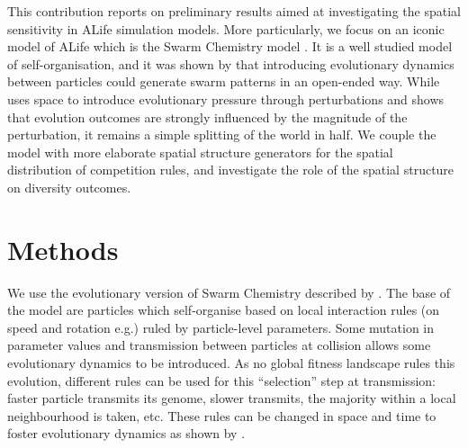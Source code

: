 \documentclass[letterpaper]{article}
\begin{document}
This contribution reports on preliminary results aimed at investigating the spatial sensitivity in ALife simulation models. More particularly, we focus on an iconic model of ALife which is the Swarm Chemistry model \citep{sayama2009swarm}. It is a well studied model of self-organisation, and it was shown by \citep{sayama2018seeking} that introducing evolutionary dynamics between particles could generate swarm patterns in an open-ended way. While \citep{sayama2018seeking} uses space to introduce evolutionary pressure through perturbations and shows that evolution outcomes are strongly influenced by the magnitude of the perturbation, it remains a simple splitting of the world in half. We couple the model with more elaborate spatial structure generators for the spatial distribution of competition rules, and investigate the role of the spatial structure on diversity outcomes.

\section{Methods}

We use the evolutionary version of Swarm Chemistry described by \citep{sayama2018seeking}. The base of the model are particles which self-organise based on local interaction rules (on speed and rotation e.g.) ruled by particle-level parameters. Some mutation in parameter values and transmission between particles at collision allows some evolutionary dynamics to be introduced. As no global fitness landscape rules this evolution, different rules can be used for this ``selection'' step at transmission: faster particle transmits its genome, slower transmits, the majority within a local neighbourhood is taken, etc. These rules can be changed in space and time to foster evolutionary dynamics as shown by \citep{sayama2018seeking}.
\end{document}
